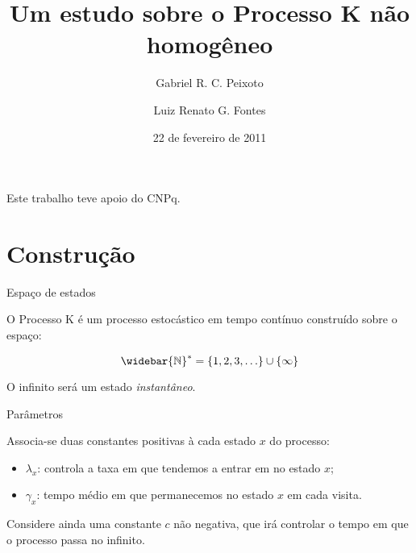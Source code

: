 \documentclass[xcolor=pdftex,dvipsnames]{beamer}
\title{Um estudo sobre o Processo K não homogêneo}
\author[Peixoto, G. R. C. \and Fontes L. R. G.]
{Gabriel R. C. Peixoto \and Luiz Renato G. Fontes}
\institute[IME-USP]{Instituto de Matemática e Estatística da
  Universidade de São Paulo}
\date{22 de fevereiro de 2011}
\newcommand{\Nzb}{{\mathbb{\widebar{N}^*}}}
\begin{document}
\begin{frame}[plain]
  \titlepage
  
  \begin{center}
    Este trabalho teve apoio do CNPq.
  \end{center}
\end{frame}

\section{Construção}


\begin{frame}{Espaço de estados}

O Processo K é um processo estocástico em tempo contínuo construído
sobre o espaço:

\begin{displaymath}
  \Nzb = \left\{
    1, 2, 3, \ldots
  \right\} \cup \{ \infty \}
\end{displaymath}

O infinito será um estado \emph{instantâneo}.

\end{frame}

\begin{frame}{Parâmetros}

  Associa-se duas constantes positivas à cada estado $x$ do processo:

  \begin{itemize}
  \item $\lambda_x$: controla a taxa em que tendemos a entrar em no
    estado $x$;
    
  \item $\gamma_x$: tempo médio em que permanecemos no estado $x$ em
    cada visita.
  \end{itemize}

  Considere ainda uma constante $c$ não negativa, que irá controlar 
  o tempo em que o processo passa no infinito.

\end{frame}
\end{document}
